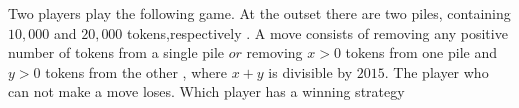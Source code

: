 Two players play the following game. At the outset there are two piles, containing $10,000$ and $20,000$ tokens,respectively . A move consists of removing any positive number of tokens from a single pile $or$ removing $x>0$ tokens from one pile and $y>0$ tokens from the other , where $x+y$ is divisible by $2015$. The player who can not make a move loses. Which player has a winning strategy
